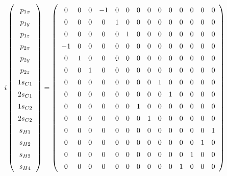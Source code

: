 \documentclass[9pt]{report}
\begin{document}
\begin{equation}
\end{equation}
\normalsize


\scriptsize
\begin{equation}
i
\renewcommand{\arraystretch}{1.4}
\left(\begin{array}{c} p_{1x}  \\  p_{1y}  \\  p_{1z}  \\  p_{2x}  \\ p_{2y} \\  p_{2z}  \\  1s_{C1}  \\  2s_{C1}  \\  1s_{C2}  \\  2s_{C2}  \\  s_{H1}  \\  s_{H2}  \\  s_{H3}  \\  s_{H4}   \\\end{array}\right)
=
\left(\begin{array}{cccccccccccccc}
0 & 0 & 0 & -1 & 0 & 0 & 0 & 0 & 0 & 0 & 0 & 0 & 0 & 0
\\
0 & 0 & 0 & 0 & 1 & 0 & 0 & 0 & 0 & 0 & 0 & 0 & 0 & 0
\\
0 & 0 & 0 & 0 & 0 & 1 & 0 & 0 & 0 & 0 & 0 & 0 & 0 & 0
\\
-1 & 0 & 0 & 0 & 0 & 0 & 0 & 0 & 0 & 0 & 0 & 0 & 0 & 0
\\
0 & 1 & 0 & 0 & 0 & 0 & 0 & 0 & 0 & 0 & 0 & 0 & 0 & 0
\\
0 & 0 & 1 & 0 & 0 & 0 & 0 & 0 & 0 & 0 & 0 & 0 & 0 & 0
\\
0 & 0 & 0 & 0 & 0 & 0 & 0 & 0 & 1 & 0 & 0 & 0 & 0 & 0
\\
0 & 0 & 0 & 0 & 0 & 0 & 0 & 0 & 0 & 1 & 0 & 0 & 0 & 0
\\
0 & 0 & 0 & 0 & 0 & 0 & 1 & 0 & 0 & 0 & 0 & 0 & 0 & 0
\\
0 & 0 & 0 & 0 & 0 & 0 & 0 & 1 & 0 & 0 & 0 & 0 & 0 & 0
\\
0 & 0 & 0 & 0 & 0 & 0 & 0 & 0 & 0 & 0 & 0 & 0 & 0 & 1
\\
0 & 0 & 0 & 0 & 0 & 0 & 0 & 0 & 0 & 0 & 0 & 0 & 1 & 0
\\
0 & 0 & 0 & 0 & 0 & 0 & 0 & 0 & 0 & 0 & 0 & 1 & 0 & 0
\\
0 & 0 & 0 & 0 & 0 & 0 & 0 & 0 & 0 & 0 & 1 & 0 & 0 & 0
\\\end{array}\right)

\end{equation}
\end{document}

